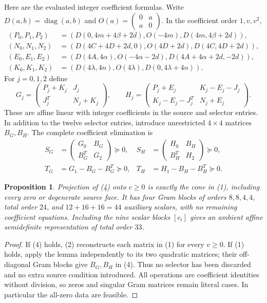 \documentclass[10pt]{article}
\newtheorem{proposition}[lemma]{Proposition}
\newcommand{\diag}{\operatorname{diag}}
\begin{document}
Here are the evaluated integer coefficient formulas. Write
$D(a,b)=\diag(a,b)$ and $O(a)=\left(\begin{smallmatrix}0&a\\a&0\end{smallmatrix}\right)$.
In the coefficient order $1,v,v^2$,
\begin{align*}
 (P_0,P_1,P_2)&=(D(0,4m+4\beta+2d),O(-4m),D(4m,4\beta+2d)),\\
 (N_0,N_1,N_2)&=(D(4C+4D+2d,0),O(4D+2d),D(4C,4D+2d)),\\
 (E_0,E_1,E_2)&=(D(4A,4\alpha),O(-4\alpha-2d),D(4A+4\alpha+2d,-2d)),\\
 (K_0,K_1,K_2)&=(D(4\lambda,4n),O(4\lambda),D(0,4\lambda+4n)).
\end{align*}
For $j=0,1,2$ define
\[
 G_j=\begin{pmatrix}P_j+K_j&J_j\\J_j^T&N_j+K_j\end{pmatrix},\qquad
 H_j=\begin{pmatrix}P_j+E_j&K_j-E_j-J_j\\
                         K_j-E_j-J_j^T&N_j+E_j\end{pmatrix}.    \tag{3}
\]
These are affine linear with integer coefficients in the source and selector
entries. In addition to the twelve selector entries, introduce unrestricted
$4\times4$ matrices $B_G,B_H$. The complete coefficient elimination is
\[
 \boxed{\begin{aligned}
 S_G&=\begin{pmatrix}G_0&B_G\\B_G^T&G_2\end{pmatrix}\succeq0,
 &S_H&=\begin{pmatrix}H_0&B_H\\B_H^T&H_2\end{pmatrix}\succeq0,\\
 T_G&=G_1-B_G-B_G^T\succeq0,
 &T_H&=H_1-B_H-B_H^T\succeq0.
 \end{aligned}}                                             \tag{4}
\]
\begin{proposition}
Projection of (4) onto $c\ge0$ is exactly the cone in (1), including every
zero or degenerate source face. It has four Gram blocks of orders
$8,8,4,4$, total order $24$, and $12+16+16=44$ auxiliary scalars, with no
remaining coefficient equations. Including the nine scalar blocks $[c_i]$
gives an ambient affine semidefinite representation of total order $33$.
\end{proposition}
\begin{proof}
If (4) holds, (2) reconstructs each matrix in (1) for every $v\ge0$.
If (1) holds, apply the lemma independently to its two quadratic matrices;
their off-diagonal Gram blocks give $B_G,B_H$ in (4). Thus no selector has
been discarded and no extra source condition introduced. All operations
are coefficient identities without division, so zeros and singular Gram
matrices remain literal cases. In particular the all-zero data are feasible.
\end{proof}
\end{document}
